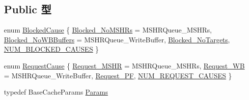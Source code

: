 \subsection*{Public 型}
\begin{DoxyCompactItemize}
\item 
enum \hyperlink{classBaseCache_a98297f294858ead7eafd19af93e64c6d}{BlockedCause} \{ \hyperlink{classBaseCache_a98297f294858ead7eafd19af93e64c6dab669a177c35c6b5166465c9e93eb71e7}{Blocked\_\-NoMSHRs} =  MSHRQueue\_\-MSHRs, 
\hyperlink{classBaseCache_a98297f294858ead7eafd19af93e64c6da1e332cbac57efe6b49ce9a0ab5e3f0de}{Blocked\_\-NoWBBuffers} =  MSHRQueue\_\-WriteBuffer, 
\hyperlink{classBaseCache_a98297f294858ead7eafd19af93e64c6da2e0db8e863cb5a0c10b73be89a535323}{Blocked\_\-NoTargets}, 
\hyperlink{classBaseCache_a98297f294858ead7eafd19af93e64c6da444545819cad907e5fafbf1c940a3f3f}{NUM\_\-BLOCKED\_\-CAUSES}
 \}
\item 
enum \hyperlink{classBaseCache_a8ca466a3028d5dd05a9f31798a0115b8}{RequestCause} \{ \hyperlink{classBaseCache_a8ca466a3028d5dd05a9f31798a0115b8a28d46d22a1bfda7d140d0496e9cb399b}{Request\_\-MSHR} =  MSHRQueue\_\-MSHRs, 
\hyperlink{classBaseCache_a8ca466a3028d5dd05a9f31798a0115b8a2c4aab170dcb384c7424ee1e77411d24}{Request\_\-WB} =  MSHRQueue\_\-WriteBuffer, 
\hyperlink{classBaseCache_a8ca466a3028d5dd05a9f31798a0115b8ad591c96d60dbceaf75076c496d695d14}{Request\_\-PF}, 
\hyperlink{classBaseCache_a8ca466a3028d5dd05a9f31798a0115b8a836f2b395337a49406bc6709a8a2ff3a}{NUM\_\-REQUEST\_\-CAUSES}
 \}
\item 
typedef BaseCacheParams \hyperlink{classBaseCache_a23c1728f4d2cabb1996560194937d427}{Params}
\end{DoxyCompactItemize}
